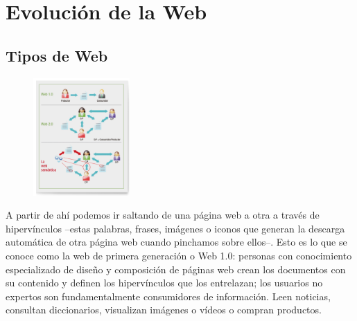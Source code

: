 \section*{Evolución de la Web}
\label{ch:ApendiceA}

\subsection{Tipos de Web} %





\begin{figure}[H]
	\centering
	\includegraphics[height=4.5cm]{imagenes/capitulo3/10}
	\caption{}
\end{figure}

A partir de ahí podemos ir saltando de una página web a otra a través de hipervínculos –estas palabras, frases, imágenes o iconos que generan la descarga automática de otra página web cuando pinchamos sobre ellos–. Esto es lo que se conoce como la web de primera generación o Web 1.0: personas con conocimiento especializado de diseño y composición de páginas web crean los documentos con su contenido y definen los hipervínculos que los entrelazan; los usuarios no expertos son fundamentalmente consumidores de información. Leen noticias, consultan diccionarios, visualizan imágenes o vídeos o compran productos. 

